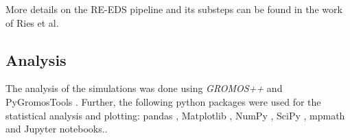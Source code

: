 More details on the RE-EDS pipeline and its substeps can be found in the work of Ries et al.\cite{Ries2021}

\subsection{Analysis}
The analysis of the simulations was done using \textit{GROMOS++} \cite{eichenberger2011} and PyGromosTools \cite{Lehner2021}. Further, the  following python packages were used for the statistical analysis and plotting: pandas \cite{Mckinney2010}, Matplotlib \cite{Hunter2007}, NumPy \cite{VanDerWalt2011}, SciPy \cite{Virtanen2020}, mpmath \cite{Johansson2013} and Jupyter notebooks.\cite{Kluyver2016}.